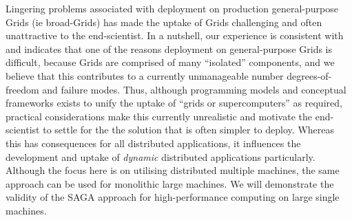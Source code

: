 \documentclass{llncs}
\begin{document}




Lingering problems associated with deployment on production
general-purpose Grids (ie broad-Grids) has made the uptake of Grids
challenging and often unattractive to the end-scientist. In a
nutshell, our experience is consistent with and indicates that one of
the reasons deployment on general-purpose Grids is difficult, because
Grids are comprised of many ``isolated'' components, and we believe
that this contributes to a currently unmanageable number
degrees-of-freedom and failure modes.  Thus, although programming
models and conceptual frameworks exists to unify the uptake of ``grids
or supercomputers'' as required, practical considerations make this
currently unrealistic and motivate the end-scientist to settle for the
the solution that is often simpler to deploy. Whereas this has
consequences for all distributed applications, it influences the
development and uptake of {\it dynamic} distributed applications
particularly.  Although the focus here is on utilising distributed
multiple machines, the same approach can be used for monolithic large
machines. We will demonstrate the validity of the SAGA approach for
high-performance computing on large single machines.
\end{document}
